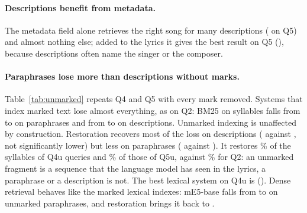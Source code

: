 \documentclass[11pt]{article}
\newcommand{\Qtwo}{Q2\xspace}
\newcommand{\Qfour}{Q4\xspace}
\newcommand{\Qfive}{Q5\xspace}
\newcommand{\Qfouru}{Q4u\xspace}
\newcommand{\Qfiveu}{Q5u\xspace}
\begin{document}
\paragraph{Descriptions benefit from metadata.} The metadata field alone retrieves the right song for many
descriptions (\MMetaFive{} on \Qfive) and almost nothing else; added to the lyrics it gives the best result on
\Qfive{} (\MLyrMetaFive), because descriptions often name the singer or the composer.

\paragraph{Paraphrases lose more than descriptions without marks.} Table~\ref{tab:unmarked} repeats \Qfour{}
and \Qfive{} with every mark removed. Systems that index marked text lose almost everything, as on \Qtwo: BM25
on syllables falls from \MSylFour{} to \MSylFourU{} on paraphrases and from \MSylFive{} to \MSylFiveU{} on
descriptions. Unmarked indexing is unaffected by construction. Restoration recovers most of the loss on
descriptions (\MRestAllBiFiveU{} against \MRestAllBiFive, not significantly lower) but less on paraphrases
(\MRestAllBiFourU{} against \MRestAllBiFour). It restores \RestoreAccAllFourU\% of the syllables of
\Qfouru{} queries and \RestoreAccAllFiveU\% of those of \Qfiveu, against \RestoreAccAll\% for \Qtwo: an
unmarked fragment is a sequence that the language model has seen in the lyrics, a paraphrase or a
description is not. The best lexical system on \Qfouru{} is \BestLexQfourUName{} (\BestLexQfourU).
Dense retrieval behaves like the marked lexical indexes: mE5-base falls from \MDenseEbaseFour{} to
\MDenseEbaseFourU{} on unmarked paraphrases, and restoration brings it back to \MDenseEbaseRestFourU.


\end{document}
